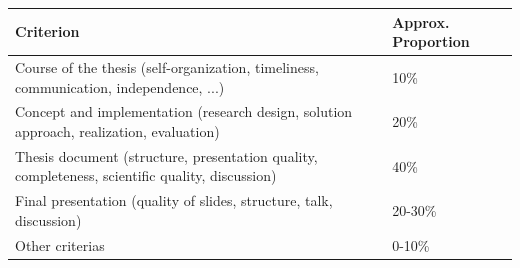 \documentclass[11pt,a4paper]{article}
\begin{document}
\begin{center}
    \begin{tabular}{|p{10.5cm}|p{4cm}|}
    \toprule
    \textbf{Criterion} & \textbf{Approx. Proportion}  \\ \midrule
    Course of the thesis (self-organization, timeliness, communication, independence, ...) & 10\% \\ \hline
    Concept and implementation (research design, solution approach, realization, evaluation) & 20\% \\ \hline
    Thesis document (structure, presentation quality, completeness, scientific quality, discussion) & 40\% \\ \hline
    Final presentation (quality of slides, structure, talk, discussion) & 20-30\% \\ \hline
    Other criterias & 0-10\% \\ \bottomrule
    \end{tabular}
\end{center}





\end{document}
